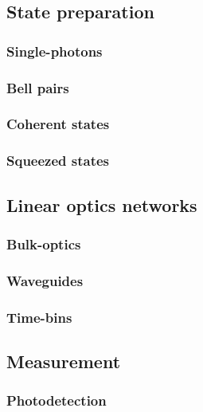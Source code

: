 \documentclass[aps,rmp,twocolumn,amsmath,amssymb,nofootinbib,superscriptaddress]{revtex4}
\newcommand{\comment}[1]{{\color{blue}{#1}}}
\begin{document}
\subsection{State preparation}

\subsubsection{Single-photons}

\subsubsection{Bell pairs}

\subsubsection{Coherent states}

\subsubsection{Squeezed states}

\subsection{Linear optics networks}

\subsubsection{Bulk-optics}

\subsubsection{Waveguides}

\subsubsection{Time-bins}

\comment{Discuss fibre-loop architecture}

\subsection{Measurement}

\subsubsection{Photodetection}
\end{document}
